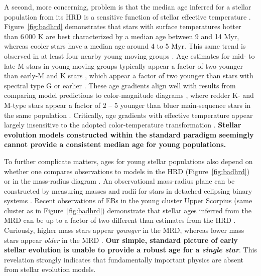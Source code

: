 A second, more concerning, problem is that the median age inferred for a stellar population from its HRD is a sensitive function of stellar effective temperature \citep{Herczeg2015}. Figure~\ref{fig:badhrd} demonstrates that stars with surface temperatures hotter than 6\,000 K are best characterized by a median age between 9 and 14 Myr, whereas cooler stars have a median age around 4 to 5 Myr. This same trend is observed in at least four nearby young moving groups \citep{Herczeg2015}. Age estimates for mid- to late-M stars in young moving groups typically appear a factor of two younger than early-M and K stars \citep{Malo2014, Herczeg2015}, which appear a factor of two younger than stars with spectral type G or earlier \citep{Hillenbrand2008}. These age gradients align well with results from comparing model predictions to color-magnitude diagrams \citep{Naylor2009}, where redder K- and M-type stars appear a factor of 2 -- 5 younger than bluer main-sequence stars in the same population \citep{Naylor2009, Bell2012}. Critically, age gradients with effective temperature appear largely insensitive to the adopted color-temperature transformation \citep{Herczeg2015}. {\bf Stellar evolution models constructed within the standard paradigm seemingly cannot provide a consistent median age for young populations.}

To further complicate matters, ages for young stellar populations also depend on whether one compares observations to models in the HRD (Figure~\ref{fig:badhrd}) or in the mass-radius diagram \citep[MRD;][]{Kraus2015}. An observational mass-radius plane can be constructed by measuring masses and radii for stars in detached eclipsing binary systems \citep[EBs;][]{Andersen1991, Torres2010}. Recent observations of EBs in the young cluster Upper Scorpius (same cluster as in Figure~\ref{fig:badhrd}) demonstrate that stellar ages inferred from the MRD can be up to a factor of two different than estimates from the HRD \citep{Kraus2015, Alonso2015, David2016}. Curiously, higher mass stars appear {\it younger} in the MRD, whereas lower mass stars appear {\it older} in the MRD \citep{Feiden2016}. {\bf Our simple, standard picture of early stellar evolution is unable to provide a robust age for a \emph{single star}}. This revelation strongly indicates that fundamentally important physics are absent from stellar evolution models. 


